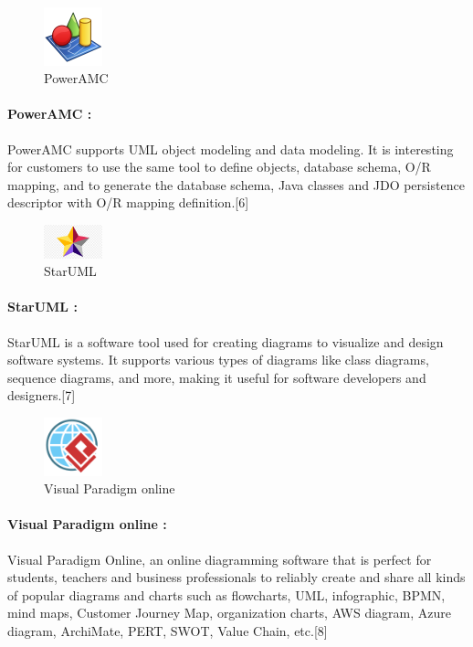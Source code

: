 \documentclass{article}
\begin{document}
\begin{figure}[htbp]
    \centering
    \includegraphics[width=0.15\textwidth]{slm}
    \caption{PowerAMC }
    \label{fig:design6}
\end{figure}
\paragraph{PowerAMC :} 
PowerAMC supports UML object modeling and data modeling. It is interesting for customers to use the same tool to define objects, database schema, O/R mapping, and to generate the database schema, Java classes and JDO persistence descriptor with O/R mapping definition.[6]\vspace{1cm}\\
\newpage

\begin{figure}[htbp]
    \centering
    \includegraphics[width=0.15\textwidth]{StarUml}
    \caption{StarUML }
    \label{fig:design6}
\end{figure}
\paragraph{StarUML :} 
StarUML is a software tool used for creating diagrams to visualize and design software systems. It supports various types of diagrams like class diagrams, sequence diagrams, and more, making it useful for software developers and designers.[7]\vspace{1cm}\\




\begin{figure}[htbp]
    \centering
    \includegraphics[width=0.15\textwidth]{parad}
    \caption{Visual Paradigm online }
    \label{fig:design6}
\end{figure}
\paragraph{Visual Paradigm online :} 
Visual Paradigm Online, an online diagramming software that is perfect for students, teachers and business professionals to reliably create and share all kinds of popular diagrams and charts such as flowcharts, UML, infographic, BPMN, mind maps, Customer Journey Map, organization charts, AWS diagram, Azure diagram, ArchiMate, PERT, SWOT, Value Chain, etc.[8]\vspace{1cm}\\
\end{document}
